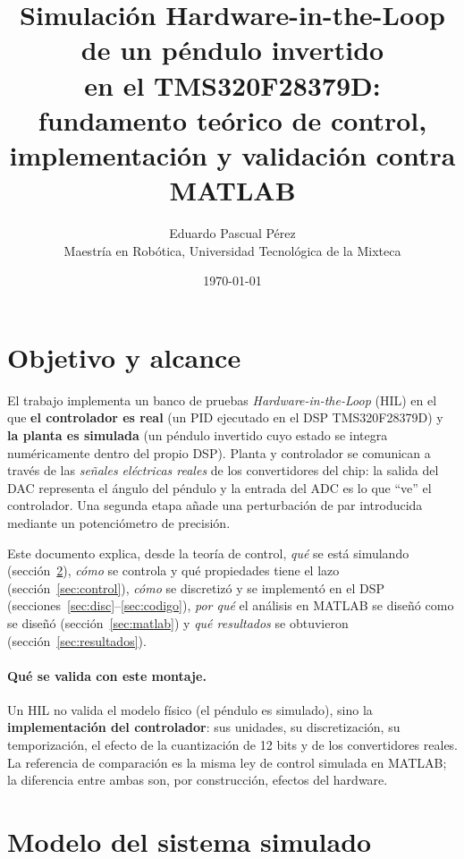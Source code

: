 \documentclass[11pt,a4paper]{article}
\title{\textbf{Simulaci\'on Hardware-in-the-Loop de un p\'endulo invertido\\
en el TMS320F28379D: fundamento te\'orico de control,\\
implementaci\'on y validaci\'on contra MATLAB}}
\author{Eduardo Pascual P\'erez\\[2pt]
\small Maestr\'ia en Rob\'otica, Universidad Tecnol\'ogica de la Mixteca}
\date{\today}
\begin{document}
\maketitle
\tableofcontents
\newpage

\section{Objetivo y alcance}
El trabajo implementa un banco de pruebas \emph{Hardware-in-the-Loop} (HIL) en el que
\textbf{el controlador es real} (un PID ejecutado en el DSP TMS320F28379D) y
\textbf{la planta es simulada} (un p\'endulo invertido cuyo estado se integra num\'ericamente
dentro del propio DSP). Planta y controlador se comunican a trav\'es de las
\emph{se\~nales el\'ectricas reales} de los convertidores del chip: la salida del
DAC representa el \'angulo del p\'endulo y la entrada del ADC es lo que ``ve'' el
controlador. Una segunda etapa a\~nade una perturbaci\'on de par introducida mediante
un potenci\'ometro de precisi\'on.

Este documento explica, desde la teor\'ia de control, \emph{qu\'e} se est\'a simulando
(secci\'on~\ref{sec:modelo}), \emph{c\'omo} se controla y qu\'e propiedades tiene el lazo
(secci\'on~\ref{sec:control}), \emph{c\'omo} se discretiz\'o y se implement\'o en el DSP
(secciones~\ref{sec:disc}--\ref{sec:codigo}), \emph{por qu\'e} el an\'alisis en MATLAB se
dise\~n\'o como se dise\~n\'o (secci\'on~\ref{sec:matlab}) y \emph{qu\'e resultados} se
obtuvieron (secci\'on~\ref{sec:resultados}).

\paragraph{Qu\'e se valida con este montaje.} Un HIL no valida el modelo f\'isico (el
p\'endulo es simulado), sino la \textbf{implementaci\'on del controlador}: sus unidades,
su discretizaci\'on, su temporizaci\'on, el efecto de la cuantizaci\'on de 12 bits y de los
convertidores reales. La referencia de comparaci\'on es la misma ley de control
simulada en MATLAB; la diferencia entre ambas son, por construcci\'on, efectos del hardware.

\section{Modelo del sistema simulado}\label{sec:modelo}
\end{document}
